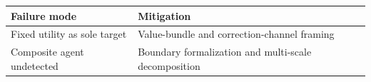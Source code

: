 
\begin{longtable}{@{}ll@{}}
\toprule
\textbf{Failure mode} & \textbf{Mitigation} \\
\midrule
Fixed utility as sole target & Value-bundle and correction-channel framing \\
Composite agent undetected & Boundary formalization and multi-scale decomposition \\
\bottomrule
\end{longtable}
